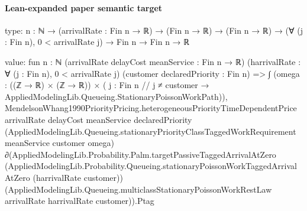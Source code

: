 \documentclass[10pt]{article}
\begin{document}
\paragraph{Lean-expanded paper semantic target}
\begin{ReviewVerbatim}
type:
{n : ℕ} → (arrivalRate : Fin n → ℝ) → (Fin n → ℝ) → (Fin n → ℝ) → (∀ (j : Fin n), 0 < arrivalRate j) → Fin n → Fin n → ℝ

value:
fun {n : ℕ} (arrivalRate delayCost meanService : Fin n → ℝ) (harrivalRate : ∀ (j : Fin n), 0 < arrivalRate j)
    (customer declaredPriority : Fin n) =>
  ∫ (omega :
    ((ℤ → ℝ) × (ℤ → ℝ)) × ({ j : Fin n // j ≠ customer } → AppliedModelingLib.Queueing.StationaryPoissonWorkPath)),
    MendelsonWhang1990PriorityPricing.heterogeneousPriorityTimeDependentPrice arrivalRate delayCost meanService
      declaredPriority
      (AppliedModelingLib.Queueing.stationaryPriorityClassTaggedWorkRequirement meanService customer
        omega) ∂(AppliedModelingLib.Probability.Palm.targetPassiveTaggedArrivalAtZero
        (AppliedModelingLib.Probability.Queueing.stationaryPoissonWorkTaggedArrivalAtZero (harrivalRate customer))
        (AppliedModelingLib.Queueing.multiclassStationaryPoissonWorkRestLaw arrivalRate harrivalRate customer)).Ptag
\end{ReviewVerbatim}
\end{document}
